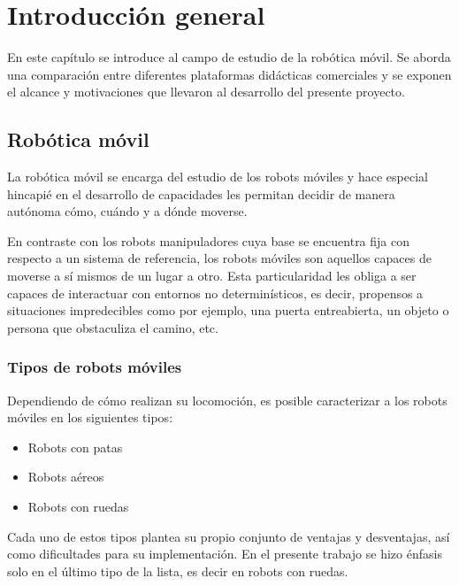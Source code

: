 \chapter{Introducción general}

\label{Capitulo1}

\newcommand{\keyword}[1]{\textbf{#1}}
\newcommand{\tabhead}[1]{\textbf{#1}}
\newcommand{\code}[1]{\texttt{#1}}
\newcommand{\file}[1]{\texttt{\bfseries#1}}
\newcommand{\option}[1]{\texttt{\itshape#1}}
\newcommand{\grados}{$^{\circ}$}

En este capítulo se introduce al campo de estudio de la robótica móvil. Se aborda una comparación entre diferentes plataformas didácticas comerciales y se exponen el alcance y motivaciones que llevaron al desarrollo del presente proyecto.

\section{Robótica móvil}

La robótica móvil se encarga del estudio de los robots móviles y hace especial hincapié en el desarrollo de capacidades les permitan decidir de manera autónoma cómo, cuándo y a dónde moverse.

En contraste con los robots manipuladores cuya base se encuentra fija con respecto a un sistema de referencia, los robots móviles son aquellos capaces de moverse a sí mismos de un lugar a otro. Esta particularidad les obliga a ser capaces de interactuar con entornos no determinísticos, es decir, propensos a situaciones impredecibles como por ejemplo, una puerta entreabierta, un objeto o persona que obstaculiza el camino, etc.

\subsection{Tipos de robots móviles}

Dependiendo de cómo realizan su locomoción, es posible caracterizar a los robots móviles en los siguientes tipos:
\begin{itemize}
	\item{Robots con patas}
	\item{Robots aéreos}
	\item{Robots con ruedas}
\end{itemize}

Cada uno de estos tipos plantea su propio conjunto de ventajas y desventajas, así como dificultades para su implementación. En el presente trabajo se hizo énfasis solo en el último tipo de la lista, es decir en robots con ruedas.

